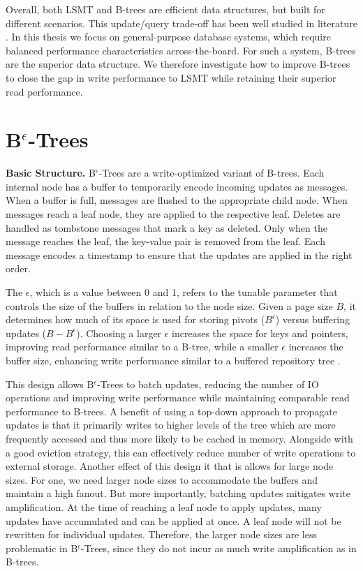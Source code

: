 Overall, both \ac{LSMT} and B-trees are efficient data structures, but built for different scenarios.
This update/query trade-off has been well studied in literature \cite{brodal2003lower}.
In this thesis we focus on general-purpose database systems, which require balanced performance characteristics across-the-board.
For such a system, B-trees are the superior data structure.
We therefore investigate how to improve B-trees to close the gap in write performance to \ac{LSMT} while retaining their superior read performance.


\section{B$^\epsilon$-Trees}
\textbf{Basic Structure.}
B$^\epsilon$-Trees \cite{bender2015epsilon} are a write-optimized variant of B-trees.
Each internal node has a buffer to temporarily encode incoming updates as messages.
When a buffer is full, messages are flushed to the appropriate child node.
When messages reach a leaf node, they are applied to the respective leaf.
Deletes are handled as tombstone messages that mark a key as deleted. Only when the message reaches the leaf, the key-value pair is removed from the leaf.
Each message encodes a timestamp to ensure that the updates are applied in the right order.

The $\epsilon$, which is a value between 0 and 1, refers to the tunable parameter that controls the size of the buffers in relation to the node size.
Given a page size $B$, it determines how much of its space is used for storing pivots ($B^\epsilon$) versus buffering updates ($B - B^\epsilon$).
Choosing a larger $\epsilon$ increases the space for keys and pointers, improving read performance similar to a B-tree, while a smaller $\epsilon$ increases the buffer size, enhancing write performance similar to a buffered repository tree \cite{buchsbaum2000external}.

This design allows B$^\epsilon$-Trees to batch updates, reducing the number of \ac{IO} operations and improving write performance while maintaining comparable read performance to B-trees.
A benefit of using a top-down approach to propagate updates is that it primarily writes to higher levels of the tree which are more frequently accessed and thus more likely to be cached in memory.
Alongside with a good eviction strategy, this can effectively reduce number of write operations to external storage.
Another effect of this design it that is allows for large node sizes.
For one, we need larger node sizes to accommodate the buffers and maintain a high fanout.
But more importantly, batching updates mitigates write amplification.
At the time of reaching a leaf node to apply updates, many updates have accumulated and can be applied at once. 
A leaf node will not be rewritten for individual updates. 
Therefore, the larger node sizes are less problematic in B$^\epsilon$-Trees, since they do not incur as much write amplification as in B-trees.

